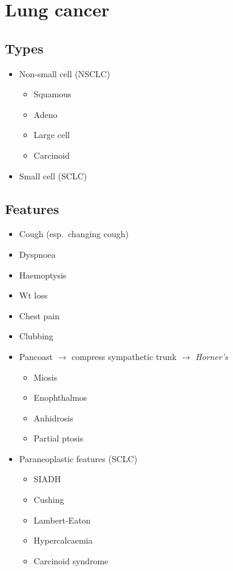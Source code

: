 \documentclass[
  12pt,
]{memoir}
\providecommand{\tightlist}{%
  \setlength{\itemsep}{0pt}\setlength{\parskip}{0pt}}
\begin{document}
\hypertarget{lung-cancer}{%
\chapter{Lung cancer}\label{lung-cancer}}

\hypertarget{types-1}{%
\section{Types}\label{types-1}}

\begin{itemize}
\tightlist
\item
  Non-small cell (NSCLC)

  \begin{itemize}
  \tightlist
  \item
    Squamous
  \item
    Adeno
  \item
    Large cell
  \item
    Carcinoid
  \end{itemize}
\item
  Small cell (SCLC)
\end{itemize}

\hypertarget{features-1}{%
\section{Features}\label{features-1}}

\begin{itemize}
\tightlist
\item
  Cough (esp.~changing cough)
\item
  Dyspnoea
\item
  Haemoptysis
\item
  Wt loss
\item
  Chest pain
\item
  Clubbing
\item
  Pancoast \(\rightarrow\) compress sympathetic trunk \(\rightarrow\)
  \emph{Horner's}

  \begin{itemize}
  \tightlist
  \item
    Miosis
  \item
    Enophthalmos
  \item
    Anhidrosis
  \item
    Partial ptosis
  \end{itemize}
\item
  Paraneoplastic features (SCLC)

  \begin{itemize}
  \tightlist
  \item
    SIADH
  \item
    Cushing
  \item
    Lambert-Eaton
  \item
    Hypercalcaemia
  \item
    Carcinoid syndrome
  \end{itemize}
\end{itemize}
\end{document}
